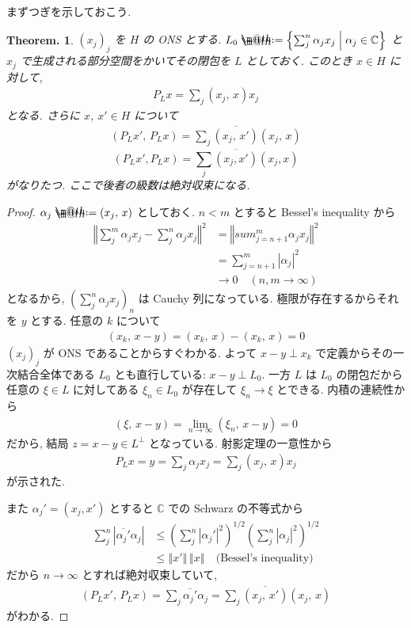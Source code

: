 \documentclass[openany, a4paper, oneside]{jsbook}
\makeatletter
\newcommand*{\defeq}{\mathrel{\rlap{%
\raisebox{0.3ex}{$\m@th\cdot$}}%
\raisebox{-0.3ex}{$\m@th\cdot$}}%
=}
\theoremstyle{break}
\theoremstyle{breakdefn}
\newtheorem{thm}{Theorem.}[section]
\newcommand{\abs}[1]{\left|#1\right|}
\newcommand{\norm}[1]{\left\Vert#1\right\Vert}
\newcommand{\rbk}[1]{\left (#1\right)}
\newcommand{\rbkt}[2]{\left ( #1,\,#2 \right)}
\newcommand{\relmiddle}[1]{\mathrel{}\middle#1\mathrel{}}
\newcommand{\set}[2]{\left\{#1 \relmiddle| #2\right\}}
\newcommand{\bbC}{\mathbb{C}}
\makeatother
\begin{document}
まずつぎを示しておこう.
\begin{thm}
 $(x_j)_j$ を $H$ の ONS とする.
 $L_0 \defeq \set{\sum_j^n \alpha_j x_j}{\alpha_j \in \bbC}$
 と $x_j$ で生成される部分空間をかいてその閉包を $L$ としておく.
 このとき $x \in H$ に対して,
 \begin{align}
  P_L x
  =
  \sum_j \rbkt{x_j}{x} x_j
 \end{align}
 となる.
 さらに $x$, $x' \in H$ について
 \begin{align}
  \rbkt{P_L x'}{P_L x}
  =
  \sum_j \overline{\rbkt{x_j}{x'}} \rbkt{x_j}{x}
 \end{align}
 \[
 (P_Lx', P_Lx) = \sum_j \overline{(x_j, x')}(x_j, x)
 \]
 がなりたつ.
 ここで後者の級数は絶対収束になる.
\end{thm}
\begin{proof}
$\alpha_j \defeq \rbkt{x_j}{x}$ としておく.
$n<m$ とすると Bessel's inequality から
\begin{align}
 \norm{\sum_j^m \alpha_j x_j - \sum_j^n \alpha_j x_j}^2
 &=
 \norm{sum_{j=n+1}^m \alpha_j x_j}^2 \\
 &=
 \sum_{j=n+1}^m \abs{\alpha_j}^2 \\
 &\to
 0 \quad (n, m \to \infty)
\end{align}
となるから, $(\sum_j^n \alpha_j x_j)_n$ は Cauchy 列になっている.
極限が存在するからそれを $y$ とする.
任意の $k$ について
\begin{align}
 \rbkt{x_k}{x - y}
 =
 \rbkt{x_k}{x} - \rbkt{x_k}{x}
 =
 0
\end{align}
$(x_j)_j$ が ONS であることからすぐわかる.
よって $x-y \perp x_k$ で定義からその一次結合全体である $L_0$ とも直行している: $x-y \perp L_0$.
一方 $L$ は $L_0$ の閉包だから任意の $\xi \in L$ に対してある $\xi_n \in L_0$ が存在して $\xi_n \to \xi$ とできる.
内積の連続性から
\begin{align}
 \rbkt{\xi}{x - y}
 =
 \lim_{n \to \infty} \rbkt{\xi_n}{x - y}
 =
 0
\end{align}
だから, 結局 $z = x-y \in L^{\perp}$ となっている.
射影定理の一意性から
\begin{align}
 P_Lx
 =
 y
 =
 \sum_j \alpha_j x_j
 =
 \sum_j \rbkt{x_j}{x} x_j
\end{align}
が示された.

また $\alpha_j' = (x_j, x')$ とすると $\bbC$ での Schwarz の不等式から
\begin{align}
 \sum_j^n \abs{\overline{\alpha_j'} \alpha_j}
 &\le
 \rbk{\sum_j^n|\alpha_j'|^2}^{1/2}
  \rbk{\sum_j^n \abs{\alpha_j}^2}^{1/2} \\
 &\le
 \norm{x'} \, \norm{x}
 \quad \text{(Bessel's inequality)}
\end{align}
だから $n \to \infty$ とすれば絶対収束していて,
\begin{align}
 \rbkt{P_L x'}{P_L x}
 =
 \sum_j \overline{\alpha_j'} \alpha_j
 =
 \sum_j \overline{\rbkt{x_j}{x'}} \rbkt{x_j}{x}
\end{align}
がわかる.
\end{proof}
\end{document}
